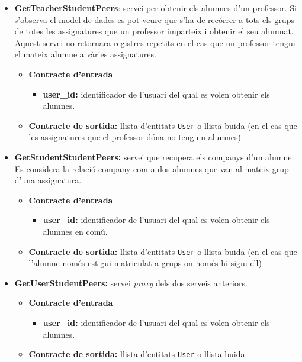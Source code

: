 \begin{itemize}
			\item \textbf{GetTeacherStudentPeers}: servei per obtenir els alumnes d'un professor. Si s'observa el model de dades es pot veure que s'ha de recórrer a tots els grups de totes les assignatures que un professor imparteix i obtenir el seu alumnat. Aquest servei no retornara registres repetits en el cas que un professor tengui el mateix alumne a vàries assignatures.
				\begin{itemize}
					\item \textbf{Contracte d'entrada}
						\begin{itemize}
							\item \textbf{user\_id:} identificador de l'usuari del qual es volen obtenir els alumnes.
						\end{itemize}
					\item \textbf{Contracte de sortida:} llista d'entitats \texttt{User} o llista buida (en el cas que les assignatures que el professor dóna no tenguin alumnes)
				\end{itemize}
			
			\item \textbf{GetStudentStudentPeers:} servei que recupera els companys d'un alumne. Es considera la relació company com a dos alumnes que van al mateix grup d'una assignatura.
			
				\begin{itemize}
					\item \textbf{Contracte d'entrada}
						\begin{itemize}
							\item \textbf{user\_id:} identificador de l'usuari del qual es volen obtenir els alumnes en comú.
						\end{itemize}
					\item \textbf{Contracte de sortida:} llista d'entitats \texttt{User} o llista buida (en el cas que l'alumne només estigui matriculat a grups on només hi sigui ell)
				\end{itemize}
				
			\item \textbf{GetUserStudentPeers:} servei \emph{proxy} dels dos serveis anteriors.
			
				\begin{itemize}
					\item \textbf{Contracte d'entrada}
						\begin{itemize}
							\item \textbf{user\_id:} identificador de l'usuari del qual es volen obtenir els alumnes.
						\end{itemize}
					\item \textbf{Contracte de sortida:} llista d'entitats \texttt{User} o llista buida.
				\end{itemize}
				

\end{itemize}
